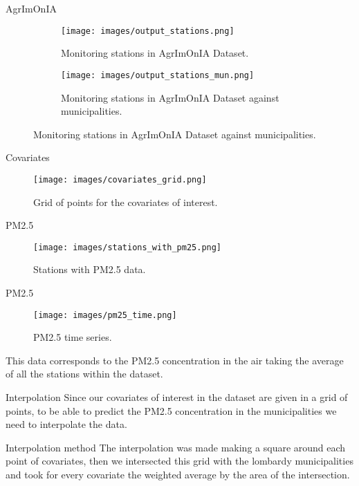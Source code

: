 \documentclass[10pt]{beamer}
\begin{document}
\begin{frame}{AgrImOnIA}
    \begin{figure}
        \begin{subfigure}{0.5\textwidth}
            \texttt{[image: images/output\_stations.png]}
            \caption{Monitoring stations in AgrImOnIA Dataset.}
        \end{subfigure}%
        \begin{subfigure}{0.5\textwidth}
            \texttt{[image: images/output\_stations\_mun.png]}
            \caption{Monitoring stations in AgrImOnIA Dataset against municipalities.}
        \end{subfigure}
    \end{figure}
\end{frame}

\begin{frame}{Covariates}
    \begin{figure}
        \texttt{[image: images/covariates\_grid.png]}
        \caption{Grid of points for the covariates of interest.}
    \end{figure}
\end{frame}

\begin{frame}{PM2.5}
    \begin{figure}
        \texttt{[image: images/stations\_with\_pm25.png]}
        \caption{Stations with PM2.5 data.}
    \end{figure}
\end{frame}

\begin{frame}{PM2.5}
    \begin{figure}
        \texttt{[image: images/pm25\_time.png]}
        \caption{PM2.5 time series.}
    \end{figure}

    This data corresponds to the PM2.5 concentration in the air taking the average of all the stations within the dataset.
\end{frame}

\begin{frame}{Interpolation}
    Since our covariates of interest in the dataset are given in a grid of points, to be able to predict the PM2.5 concentration in the municipalities we need to interpolate the data.

    \begin{block}{Interpolation method}
        The interpolation was made making a square around each point of covariates, then we intersected this grid with the lombardy municipalities and took for every covariate the weighted average by the area of the intersection.
    \end{block}

\end{frame}
\end{document}
